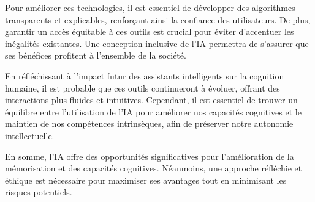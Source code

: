 \documentclass[12pt,a4paper]{report}
\begin{document}
Pour améliorer ces technologies, il est essentiel de développer des algorithmes transparents et explicables, renforçant ainsi la confiance des utilisateurs. De plus, garantir un accès équitable à ces outils est crucial pour éviter d'accentuer les inégalités existantes. Une conception inclusive de l'IA permettra de s'assurer que ses bénéfices profitent à l'ensemble de la société. 

En réfléchissant à l'impact futur des assistants intelligents sur la cognition humaine, il est probable que ces outils continueront à évoluer, offrant des interactions plus fluides et intuitives. Cependant, il est essentiel de trouver un équilibre entre l'utilisation de l'IA pour améliorer nos capacités cognitives et le maintien de nos compétences intrinsèques, afin de préserver notre autonomie intellectuelle. 

En somme, l'IA offre des opportunités significatives pour l'amélioration de la mémorisation et des capacités cognitives. Néanmoins, une approche réfléchie et éthique est nécessaire pour maximiser ses avantages tout en minimisant les risques potentiels.
\end{document}
